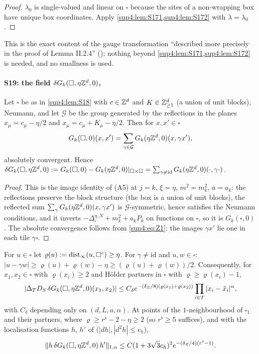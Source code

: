 \begin{proof}
$\lambda_0$ is single-valued and linear on $\square$ because the sites of a non-wrapping box have unique box coordinates. Apply \cref{sup4:lem:S171,sup4:lem:S172} with $\lambda=\lambda_0$.
\end{proof}

This is the exact content of the gauge transformation ``described more precisely in the proof of Lemma II.2.4'' (\cite[(2.69)--(2.74)]{Ba2}); nothing beyond \cref{sup4:lem:S171,sup4:lem:S172} is needed, and no smallness is used.

\paragraph*{S19: the field $\delta G_k(\square,\eta\mathbb Z^d,0)$, \cite[p.~433]{Ba3}}

\begin{lemma}[images]\label{sup4:lem:S191}
Let $\square$ be as in \cref{sup4:lem:S18} with $c\in\mathbb Z^d$ and $K\in\mathbb Z^d_{\ge1}$ (a union of unit blocks), Neumann, and let $\mathcal G$ be the group generated by the reflections in the planes $x_\mu=c_\mu-\eta/2$ and $x_\mu=c_\mu+K_\mu-\eta/2$. Then for $x,x'\in\square$
\[
G_k(\square,0)(x,x')=\sum_{\gamma\in\mathcal G}G_k(\eta\mathbb Z^d,0)(x,\gamma x'),
\]
absolutely convergent. Hence $\delta G_k(\square,\eta\mathbb Z^d,0):= G_k(\square,0)-G_k(\eta\mathbb Z^d,0)|_{\square\times\square}=\sum_{\gamma\ne\mathrm{id}}G_k(\eta\mathbb Z^d,0)(\cdot,\gamma\cdot)$.
\end{lemma}

\begin{proof}
This is the image identity of (A5) at $j=k$, $\xi=\eta$, $m^2=m_k^2$, $a=a_k$: the reflections preserve the block structure (the box is a union of unit blocks), the reflected sum $\sum_\gamma G_k(\eta\mathbb Z^d,0)(x,\gamma x')$ is $\mathcal G$-symmetric, hence satisfies the Neumann conditions, and it inverts $-\Delta^{\eta,N}_\square+m_k^2+a_kP_k$ on functions on $\square$, so it is $G_k(\square,0)$. The absolute convergence follows from \eqref{sup4:eq:Z1}: the images $\gamma x'$ lie one in each tile $\gamma\square$.
\end{proof}

\begin{lemma}[bound]\label{sup4:lem:S192}
For $u\in\square$ let $\varrho(u):=\operatorname{dist}_\infty(u,\square^c)\ge\eta$. For $\gamma\ne\mathrm{id}$ and $u,w\in\square$: $|u-\gamma w|\ge\varrho(u)+\varrho(w)-\eta\ge(\varrho(u)+\varrho(w))/2$. Consequently, for $x_1,x_2\in\square$ with $\varrho(x_i)\ge2$ and H\"older partners in $\square$ with $\varrho\ge\varrho(x_i)-1$,
\[
|\Delta_TD_S\,\delta G_k(\square,\eta\mathbb Z^d,0)(x_1,x_2)|\le C_\delta e^{-(\delta_Z/8)(\varrho(x_1)+\varrho(x_2))}\prod_{i\in T}|x_i-\tilde x_i|^\alpha,
\]
with $C_\delta$ depending only on $(d,L,a,\alpha)$. At points of the $1$-neighbourhood of $\square_1$ and their partners, where $\varrho\ge r^\flat-2-\eta\ge2$ (so $r^\flat\ge5$ suffices), and with the localisation functions $h$, $h'$ of \cite[p.~432]{Ba3} ($|d h|,|d^2h|\le c_h$),
\[
\lVert h\,\delta G_k(\square,\eta\mathbb Z^d,0)\,h'\rVert_{1,\alpha}\le C(1+3\sqrt3c_h)^2e^{-(\delta_Z/4)(r^\flat-1)}.
\]
\end{lemma}

